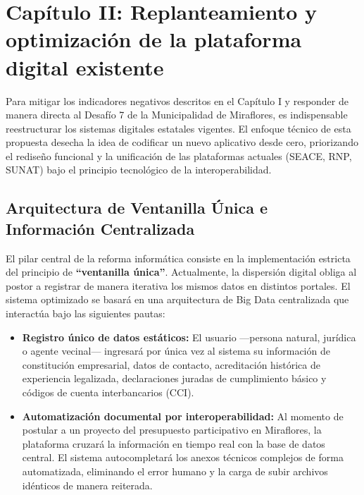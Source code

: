 \documentclass[12pt,a4paper]{article}
\begin{document}
\newpage

\section{Capítulo II: Replanteamiento y optimización de la plataforma digital existente}

Para mitigar los indicadores negativos descritos en el Capítulo I y responder de manera directa al Desafío 7 de la Municipalidad de Miraflores, es indispensable reestructurar los sistemas digitales estatales vigentes. El enfoque técnico de esta propuesta desecha la idea de codificar un nuevo aplicativo desde cero, priorizando el rediseño funcional y la unificación de las plataformas actuales (SEACE, RNP, SUNAT) bajo el principio tecnológico de la interoperabilidad.

\subsection{Arquitectura de Ventanilla Única e Información Centralizada}
El pilar central de la reforma informática consiste en la implementación estricta del principio de \textbf{``ventanilla única''}. Actualmente, la dispersión digital obliga al postor a registrar de manera iterativa los mismos datos en distintos portales. El sistema optimizado se basará en una arquitectura de Big Data centralizada que interactúa bajo las siguientes pautas:
\begin{itemize}
    \item \textbf{Registro único de datos estáticos:} El usuario ---persona natural, jurídica o agente vecinal--- ingresará por única vez al sistema su información de constitución empresarial, datos de contacto, acreditación histórica de experiencia legalizada, declaraciones juradas de cumplimiento básico y códigos de cuenta interbancarios (CCI).
    \item \textbf{Automatización documental por interoperabilidad:} Al momento de postular a un proyecto del presupuesto participativo en Miraflores, la plataforma cruzará la información en tiempo real con la base de datos central. El sistema autocompletará los anexos técnicos complejos de forma automatizada, eliminando el error humano y la carga de subir archivos idénticos de manera reiterada.
\end{itemize}
\end{document}
